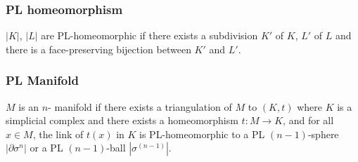 \documentclass{article}
\theoremstyle{definition}
\numberwithin{theorem}{section}
\numberwithin{equation}{section}
\begin{document}
\subsubsection{PL homeomorphism}
$|K|$, $|L|$ are PL-homeomorphic if there exists a subdivision $K'$ of $K$, $L'$ of $L$ and there is a face-preserving bijection between $K'$ and $L'$. 

\subsubsection{PL Manifold}
$M$ is an $n$- manifold if there exists a triangulation of $M$ to $(K, t)$ where $K$ is a simplicial complex and there exists a homeomorphism $t : M \rightarrow K$, and for all $x \in M$, the link of $t(x)$ in $K$ is PL-homeomorphic to a PL $(n-1)$-sphere $|\partial \sigma^n|$ or a PL $(n-1)$-ball $|\sigma^{(n-1)}|$. 
\end{document}
